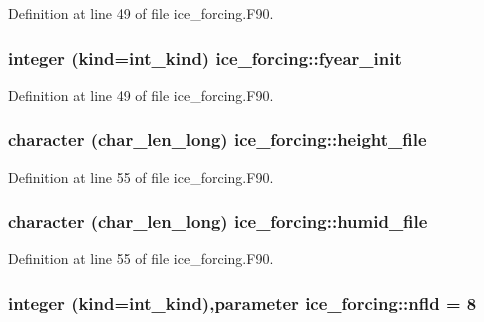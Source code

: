 Definition at line 49 of file ice\_\-forcing.F90.\hypertarget{namespaceice__forcing_a00220497cafa391e9105c65fad81c982}{
\subsubsection[{fyear\_\-init}]{\setlength{\rightskip}{0pt plus 5cm}integer (kind=int\_\-kind) {\bf ice\_\-forcing::fyear\_\-init}}}
\label{namespaceice__forcing_a00220497cafa391e9105c65fad81c982}


Definition at line 49 of file ice\_\-forcing.F90.\hypertarget{namespaceice__forcing_ab619dc21fc4da36e5f02a12ca1e7944d}{
\subsubsection[{height\_\-file}]{\setlength{\rightskip}{0pt plus 5cm}character (char\_\-len\_\-long) {\bf ice\_\-forcing::height\_\-file}}}
\label{namespaceice__forcing_ab619dc21fc4da36e5f02a12ca1e7944d}


Definition at line 55 of file ice\_\-forcing.F90.\hypertarget{namespaceice__forcing_a2a98f60110b3268470cdb52f6b63486c}{
\subsubsection[{humid\_\-file}]{\setlength{\rightskip}{0pt plus 5cm}character (char\_\-len\_\-long) {\bf ice\_\-forcing::humid\_\-file}}}
\label{namespaceice__forcing_a2a98f60110b3268470cdb52f6b63486c}


Definition at line 55 of file ice\_\-forcing.F90.\hypertarget{namespaceice__forcing_ae1362a8a47b05e49acfce2142d98fdd5}{
\subsubsection[{nfld}]{\setlength{\rightskip}{0pt plus 5cm}integer (kind=int\_\-kind),parameter {\bf ice\_\-forcing::nfld} = 8}}
\label{namespaceice__forcing_ae1362a8a47b05e49acfce2142d98fdd5}



